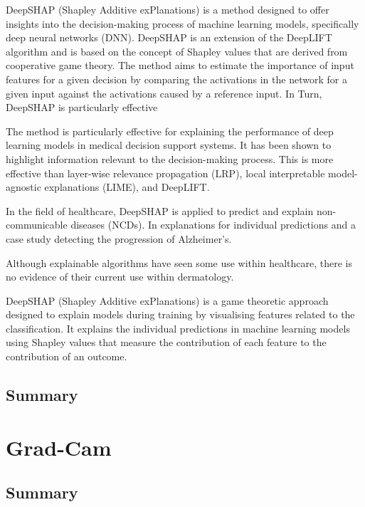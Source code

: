 DeepSHAP (Shapley Additive exPlanations) is a method designed to offer insights into the decision-making process of machine learning models, specifically deep neural networks (DNN). DeepSHAP is an extension of the DeepLIFT algorithm and is based on the concept of Shapley values that are derived from cooperative game theory. The method aims to estimate the importance of input features for a given decision by comparing the activations in the network for a given input against the activations caused by a reference input. In Turn, DeepSHAP is particularly effective

The method is particularly effective for explaining the performance of deep learning models in medical decision support systems\cite{}. It has been shown to highlight information relevant to the decision-making process. This is more effective than layer-wise relevance propagation (LRP), local interpretable model-agnostic explanations (LIME), and DeepLIFT.

In the field of healthcare, DeepSHAP is applied to predict and explain non-communicable diseases (NCDs). In explanations for individual predictions and a case study detecting the progression of Alzheimer's. 

Although explainable algorithms have seen some use within healthcare, there is no evidence of their current use within dermatology.

DeepSHAP (Shapley Additive exPlanations) is a game theoretic approach designed to explain models during training by visualising features related to the classification. It explains the individual predictions in machine learning models using Shapley values that measure the contribution of each feature to the contribution of an outcome\cite{Aas2021}.



\subsection{Summary}

\section{Grad-Cam}




\subsection{Summary}

